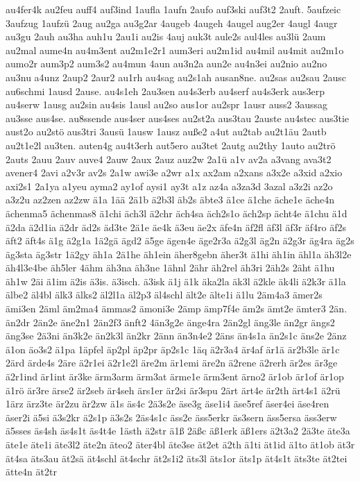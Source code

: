 {au4fer4k
au2feu
auff4
auf3ind
1aufla
1aufn
2aufo
auf3ski
auf3t2
2auft.
5aufzeic
3aufzug
1aufzü
2aug
au2ga
au3g2ar
4augeb
4augeh
4augel
aug2er
4augl
4augr
au3gu
2auh
au3ha
auh1u
2au1i
au2is
4auj
auk3t
aule2s
aul4les
au3lü
2aum
au2mal
aume4n
au4m3ent
au2m1e2r1
aum3eri
au2m1id
au4mil
au4mit
au2m1o
aumo2r
aum3p2
aum3s2
au4mun
4aun
au3n2a
aun2e
au4n3ei
au2nio
au2no
au3nu
a4unz
2aup2
2aur2
au1rh
au4sag
au2s1ah
ausan8ne.
au2sas
au2sau
2ausc
au6schmi
1ausd
2ause.
au4s1eh
2au3sen
au4s3erb
au4serf
au4s3erk
aus3erp
au4serw
1ausg
au2sin
au4sis
1ausl
au2so
aus1or
au2spr
1ausr
auss2
3aussag
au3sse
aus4se.
au8ssende
aus4ser
aus4ses
au2st2a
aus3tau
2auste
au4stec
aus3tie
aust2o
au2stö
aus3tri
3ausü
1ausw
1ausz
auße2
a4ut
au2tab
au2t1äu
2autb
au2t1e2l
au3ten.
auten4g
au4t3erh
aut5ero
au3tet
2autg
au2thy
1auto
au2trö
2auts
2auu
2auv
auve4
2auw
2aux
2auz
auz2w
2a1ü
a1v
av2a
a3vang
ava3t2
avener4
2avi
a2v3r
av2s
2a1w
awi3e
a2wr
a1x
ax2am
a2xans
a3x2e
a3xid
a2xio
axi2s1
2a1ya
a1yeu
ayma2
ay1of
aysi1
ay3t
a1z
az4a
a3za3d
3azal
a3z2i
az2o
a3z2u
az2zen
az2zw
ä1a
1ää
2ä1b
ä2b3l
äb2s
äbte3
ä1ce
ä1che
äche1e
äche4n
ächenma5
ächenmas8
ä1chi
äch3l
ä2chr
äch4sa
äch2s1o
äch2sp
ächt4e
ä1chu
ä1d
ä2da
ä2d1ia
ä2dr
äd2s
äd3te
2ä1e
äe4k
ä3eu
äe2x
äfe4n
äf2fl
äf3l
äf3r
äf4ro
äf2s
äft2
äft4s
ä1g
ä2g1a
1ä2gä
ägd2
ä5ge
ägen4e
äge2r3a
ä2g3l
äg2n
ä2g3r
äg4ra
äg2s
äg3sta
äg3str
1ä2gy
äh1a
2ä1he
äh1ein
äher8gebn
äher3t
ä1hi
äh1in
ähl1a
äh3l2e
äh4l3e4be
äh5ler
4ähm
äh3na
äh3ne
1ähnl
2ähr
äh2rel
äh3ri
2äh2s
2äht
ä1hu
äh1w
2äi
ä1im
ä2is
ä3is.
ä3isch.
ä3isk
ä1j
ä1k
äka2la
äk3l
ä2kle
äk4li
ä2k3r
ä1la
älbe2
äl4bl
älk3
älks2
äl2l1a
äl2p3
äl4schl
ält2e
älte1i
ä1lu
2äm4a3
ämer2s
ämi3en
2äml
äm2ma4
ämmas2
ämoni3e
2ämp
ämp7f4e
äm2s
ämt2e
ämter3
2än.
än2dr
2än2e
äne2n1
2än2f3
änft2
4än3g2e
änge4ra
2än2gl
äng3le
än2gr
ängs2
äng3se
2ä3ni
än3k2e
än2k3l
än2kr
2änn
än3n4e2
2äns
än4s1a
än2s1c
äns2e
2änz
ä1on
äo3s2
ä1pa
1äpfel
äp2pl
äp2pr
äp2s1c
1äq
ä2r3a4
är4af
är1ä
är2b3le
är1c
2ärd
ärde4s
2äre
ä2r1ei
ä2r1e2l
äre2m
är1emi
äre2n
ä2rene
ä2rerh
är2es
är3ge
ä2r1ind
är1int
är3ke
ärm3arm
ärm3at
ärme1e
ärm3ent
ärno2
är1ob
är1of
är1op
ä1rö
är3re
ärse2
är2seb
är4seh
ärs1er
är2si
är3spu
2ärt
ärt4e
är2th
ärt4s1
ä2rü
1ärz
ärz3te
är2zu
är2zw
ä1s
äs4c
2ä3s2e
äse3g
äse1i4
äse5ref
äser4ei
äse4ren
äser2i
ä5si
ä3s2kr
ä2s1p
ä3s2s
2äs4s1c
äss2e
äss5erkr
äs3sern
äss5ersa
äss3erw
ä5sses
äs4sh
äs4s1t
äs4t4e
1ästh
ä2str
ä1ß
2äßc
äß1erk
äß1ers
ä2t3a2
2ä3te
äte3a
äte1e
äte1i
äte3l2
äte2n
äteo2
äter4bl
äte3se
ät2et
ä2th
ä1ti
ät1id
ä1to
ät1ob
ät3r
ät4sa
äts3au
ät2sä
ät4schl
ät4schr
ät2s1i2
äts3l
äts1or
äts1p
ät4s1t
äts3te
ät2tei
ätte4n
ät2tr
}
